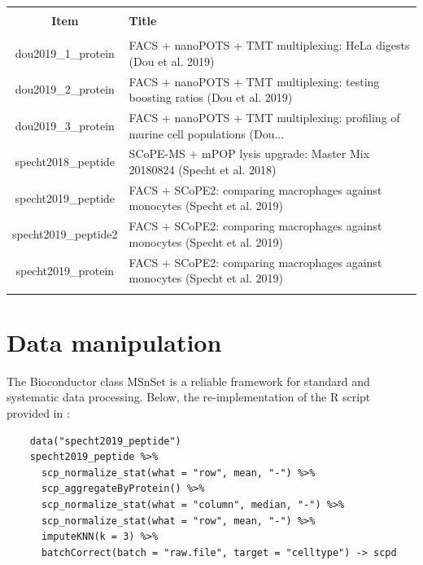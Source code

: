 \documentclass{article}
\newcommand{\hcode}[2][lgray]{{\ttfamily\color{vdgray}\colorbox{#1}{#2}}}
\begin{document}
\begin{multicols}{2}
\begin{minipage}[t]{\linewidth}
  \scriptsize
  \begin{tabular}{@{\extracolsep{5pt}} cl} 
    \\[-1.8ex]\hline 
    \hline \\[-1.8ex] 
    \textbf{Item} & \textbf{Title} \\ 
    \hline \\[-1.8ex] 
    dou2019\_1\_protein & FACS + nanoPOTS + TMT multiplexing: HeLa digests (Dou et al. 2019) \\ 
    dou2019\_2\_protein & FACS + nanoPOTS + TMT multiplexing: testing boosting ratios (Dou et al. 2019) \\ 
    dou2019\_3\_protein & FACS + nanoPOTS + TMT multiplexing: profiling of murine cell populations (Dou... \\
    specht2018\_peptide & SCoPE-MS + mPOP lysis upgrade: Master Mix 20180824 (Specht et al. 2018) \\ 
    specht2019\_peptide & FACS + SCoPE2: comparing macrophages against monocytes (Specht et al. 2019) \\ 
    specht2019\_peptide2 & FACS + SCoPE2: comparing macrophages against monocytes (Specht et al. 2019) \\ 
    specht2019\_protein & FACS + SCoPE2: comparing macrophages against monocytes (Specht et al. 2019) \\ 
    \hline \\[-1.8ex] 
  \end{tabular} 
  
\end{minipage}
  

\noindent
\begin{minipage}[t]{\linewidth}
  \vspace{0.55cm}
  \section*{\huge Data manipulation}
  \large
  
  The Bioconductor class \hcode{MSnSet} is a reliable framework for standard and systematic data processing. Below, the re-implementation of the R script provided in \cite{Specht2019-jm}:
  

  \begin{lstlisting}
    data("specht2019_peptide")
    specht2019_peptide %>% 
      scp_normalize_stat(what = "row", mean, "-") %>%
      scp_aggregateByProtein() %>%
      scp_normalize_stat(what = "column", median, "-") %>%
      scp_normalize_stat(what = "row", mean, "-") %>%
      imputeKNN(k = 3) %>%
      batchCorrect(batch = "raw.file", target = "celltype") -> scpd
  \end{lstlisting}
  

\end{minipage}
\end{multicols}
\end{document}
